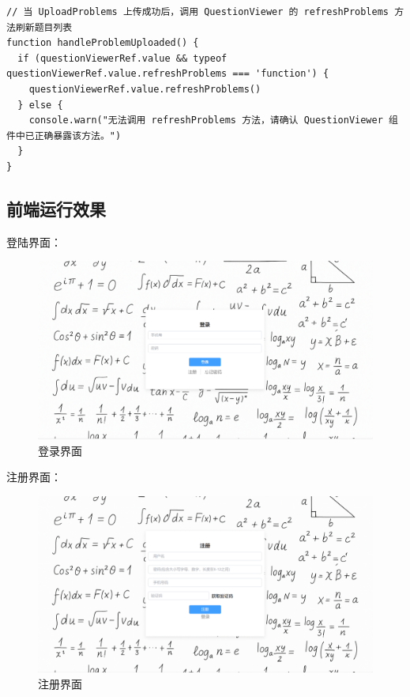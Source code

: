 \documentclass[a4paper,AutoFakeBold={2.7}]{ctexart} %
\begin{document}
\begin{lstlisting}
// 当 UploadProblems 上传成功后，调用 QuestionViewer 的 refreshProblems 方法刷新题目列表
function handleProblemUploaded() {
  if (questionViewerRef.value && typeof questionViewerRef.value.refreshProblems === 'function') {
    questionViewerRef.value.refreshProblems()
  } else {
    console.warn("无法调用 refreshProblems 方法，请确认 QuestionViewer 组件中已正确暴露该方法。")
  }
}
\end{lstlisting}

\subsection{前端运行效果}

登陆界面：
\begin{figure}[H]
    \centering
	\includegraphics[width=\linewidth]{./图片/登录界面.png}
	\caption{登录界面}\label{登录界面}
\end{figure}

注册界面：

\begin{figure}[H]
	\centering
	\includegraphics[width=\linewidth]{./图片/注册界面.png}
	\caption{注册界面}\label{注册界面}
\end{figure}
\end{document}
